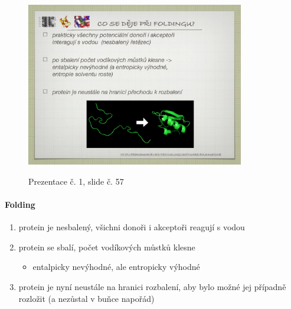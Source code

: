 \documentclass[DIV=8]{scrreprt}
\begin{document}
\begin{figure}
    \caption{Prezentace č. 1, slide č. 57}
    \includegraphics[width=0.85\textwidth]{slides-1/slide-57.jpg}
    \centering
    \label{slides-1-slide-57}
\end{figure}

\paragraph{Folding}
\begin{enumerate}[nosep]
    \item protein je nesbalený, všichni donoři i akceptoři reagují s vodou
    \item protein se sbalí, počet vodíkových můstků klesne
\begin{itemize}[nosep]
    \item entalpicky nevýhodné, ale entropicky výhodné
\end{itemize}

    \item protein je nyní neustále na hranici rozbalení, aby bylo možné jej případně rozložit (a nezůstal v buňce napořád)
\end{enumerate}
\end{document}
